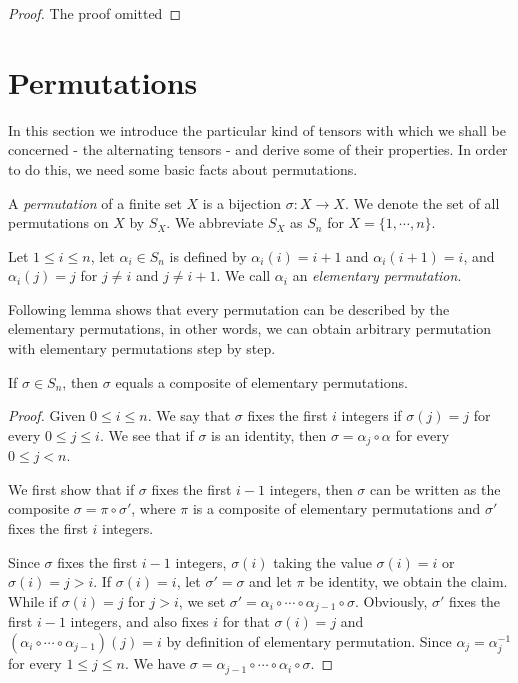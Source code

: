 \begin{subappendices}
\begin{proof}
    The proof omitted
\end{proof}


\section{Permutations}
In this section we introduce the particular kind of tensors with which we shall be concerned - the alternating tensors - and derive some of their properties. In order to do this, we need some basic facts about permutations.

\begin{definition}[Permutation]
    A \emph{permutation} of a finite set $X$ is a bijection $\sigma : X \to X$. We denote the set of all permutations on $X$ by $S_X$. We abbreviate $S_X$ as $S_n$ for $X = \{1, \cdots, n\}$.
\end{definition}

\begin{definition}
    Let $1 \leq i \leq n$, let $\alpha_{i} \in S_n$ is defined by $\alpha_i(i) = i + 1$ and $\alpha_i(i + 1) = i$, and $\alpha_i(j) = j$ for $j \neq i$ and $j \neq i + 1$. We call $\alpha_i$ an \emph{elementary permutation}.
\end{definition}

Following lemma shows that every permutation can be described by the elementary permutations, in other words, we can obtain arbitrary permutation with elementary permutations step by step.

\begin{lemma}
    If $\sigma \in S_n$, then $\sigma$ equals a composite of elementary permutations.
\end{lemma}

\begin{proof}
    Given $0 \leq i \leq n$. We say that $\sigma$ fixes the first $i$ integers if $\sigma(j) = j$ for every $0 \leq j \leq i$. We see that if $\sigma$ is an identity, then $\sigma = \alpha_j \circ \alpha$ for every $0 \leq j < n$.

    We first show that if $\sigma$ fixes the first $i - 1$ integers, then $\sigma$ can be written as the composite $\sigma = \pi \circ \sigma'$, where $\pi$ is a composite of elementary permutations and $\sigma'$ fixes the first $i$ integers.

    Since $\sigma$ fixes the first $i - 1$ integers, $\sigma(i)$ taking the value $\sigma(i) = i$ or $\sigma(i) = j > i$. If $\sigma(i) = i$, let $\sigma' = \sigma$ and let $\pi$ be identity, we obtain the claim. While if $\sigma(i) = j$ for $j > i$, we set $\sigma' = \alpha_i \circ \cdots \circ \alpha_{j - 1} \circ \sigma$. Obviously, $\sigma'$ fixes the first $i - 1$ integers, and also fixes $i$ for that $\sigma(i) = j$ and $(\alpha_i \circ \cdots \circ \alpha_{j - 1})(j) = i$ by definition of elementary permutation. Since $\alpha_j = \alpha_j^{-1}$ for every $1 \leq j \leq n$. We have $\sigma = \alpha_{j - 1}\circ \cdots \circ \alpha_i \circ \sigma$.


\end{proof}
\end{subappendices}
